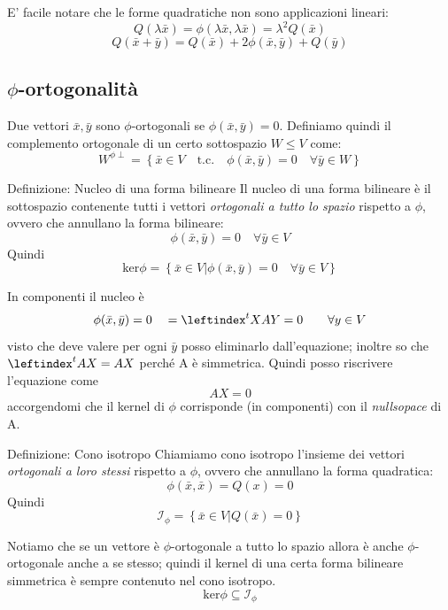 \documentclass[x11names]{article}
\begin{document}
E' facile notare che le forme quadratiche non sono applicazioni lineari:
\[
Q(\lambda\bar{x}) = \phi(\lambda\bar{x},\lambda\bar{x}) = \lambda^2Q(\bar{x})
\]
\[
Q(\bar{x} + \bar{y}) = Q(\bar{x}) + 2\phi(\bar{x},\bar{y}) + Q(\bar{y})
\]
\subsection{$\phi$-ortogonalità}
Due vettori $\bar{x},\bar{y}$ sono $\phi$-ortogonali se $\phi (\bar{x},\bar{y}) = 0$. Definiamo quindi il complemento ortogonale di un certo sottospazio $W \leq V$ come:
\[
W^{\phi \perp} = \left\{\bar{x} \in V \quad \text{t.c.} \quad \phi(\bar{x},\bar{y}) = 0 \quad \forall \bar{y} \in W \right\}
\]

	\begin{center}
	\colorbox{myblue}{\begin{minipage}{5.75in}
			\begin{blues}{Definizione: Nucleo di una forma bilineare}
			Il nucleo di una forma bilineare è il sottospazio contenente tutti i vettori \textit{ortogonali a tutto lo spazio} rispetto a $\phi$, ovvero che annullano la forma bilineare:
			\[
			\phi(\bar{x},\bar{y}) = 0 \quad \forall \bar{y} \in V
			\]
			Quindi
			\[
			\text{ker}\phi = \left\{\bar{x} \in V | \phi(\bar{x},\bar{y}) = 0 \quad \forall \bar{y} \in V\right\}
			\]
			\end{blues}
	\end{minipage}}       
\end{center}

\noindent
In componenti il nucleo è 
\[
\phi(\bar{x},\bar{y}) = 0 \quad  = \leftindex^{t}{X}AY = 0 \qquad \forall y \in V
\]
visto che deve valere per ogni $\bar{y}$ posso eliminarlo dall'equazione; inoltre so che $\leftindex^{t}{A}X = AX$ perché A è simmetrica. Quindi posso riscrivere l'equazione come
\[
 AX = 0
\]
accorgendomi che il kernel di $\phi$ corrisponde (in componenti) con il \textit{nullsopace} di A.
	\begin{center}
	\colorbox{myblue}{\begin{minipage}{5.75in}
			\begin{blues}{Definizione: Cono isotropo}
				Chiamiamo cono isotropo l'insieme dei vettori \textit{ortogonali a loro stessi} rispetto a $\phi$, ovvero che annullano la forma quadratica:
				\[
				\phi(\bar{x},\bar{x}) = Q(x) = 0
				\]
				Quindi
				\[
				\mathcal{I}_\phi = \left\{\bar{x} \in V | Q(\bar{x}) = 0 \right\}
				\]
			\end{blues}
	\end{minipage}}       
\end{center}
Notiamo che se un vettore è $\phi$-ortogonale a tutto lo spazio allora è anche $\phi$-ortogonale anche a se stesso; quindi il kernel di una certa forma bilineare simmetrica è sempre contenuto nel cono isotropo.
\[
\text{ker}\phi \subseteq \mathcal{I}_{\phi}
\]
\end{document}
